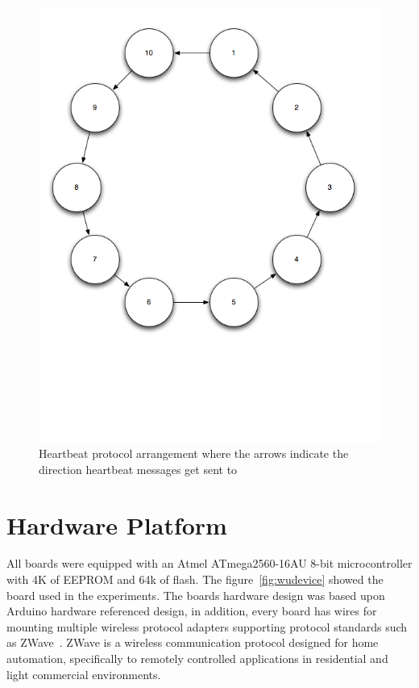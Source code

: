 \begin{figure}[h!]
\centering
    \includegraphics[width=\linewidth]{figures/heartbeat-protocol-arrangement}
\caption{Heartbeat protocol arrangement where the arrows indicate the direction
  heartbeat messages get sent to}
\label{fig:heartbeat-protocol-arrangement}
\end{figure}

\section{Hardware Platform}

All boards were equipped with an Atmel ATmega2560-16AU 8-bit microcontroller
with 4K of EEPROM and 64k of flash. The figure~\ref{fig:wudevice} showed the
board used in the experiments. The boards hardware design was based upon Arduino
hardware referenced design, in addition, every board has wires for mounting
multiple wireless protocol adapters supporting protocol standards such as
ZWave~\cite{ZWave}. ZWave is a wireless communication protocol designed for home
automation, specifically to remotely controlled applications in residential and
light commercial environments.

